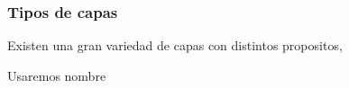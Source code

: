 
\subsubsection{Tipos de capas}



Existen una gran variedad de capas con distintos propositos,

Usaremos nombre

